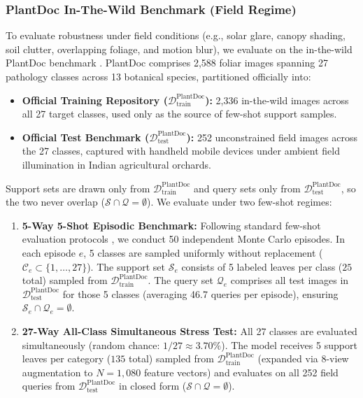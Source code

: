 \documentclass[preprint,12pt]{elsarticle}
\begin{document}
\subsubsection{PlantDoc In-The-Wild Benchmark (Field Regime)}
To evaluate robustness under field conditions (e.g., solar glare, canopy shading, soil clutter, overlapping foliage, and motion blur), we evaluate on the in-the-wild PlantDoc benchmark \cite{singh2020plantdoc}. PlantDoc comprises 2,588 foliar images spanning 27 pathology classes across 13 botanical species, partitioned officially into:
\begin{itemize}
    \item \textbf{Official Training Repository ($\mathcal{D}_{\text{train}}^{\text{PlantDoc}}$):} 2,336 in-the-wild images across all 27 target classes, used only as the source of few-shot support samples.
    \item \textbf{Official Test Benchmark ($\mathcal{D}_{\text{test}}^{\text{PlantDoc}}$):} 252 unconstrained field images across the 27 classes, captured with handheld mobile devices under ambient field illumination in Indian agricultural orchards.
\end{itemize}
Support sets are drawn only from $\mathcal{D}_{\text{train}}^{\text{PlantDoc}}$ and query sets only from $\mathcal{D}_{\text{test}}^{\text{PlantDoc}}$, so the two never overlap ($\mathcal{S} \cap \mathcal{Q} = \emptyset$). We evaluate under two few-shot regimes:
\begin{enumerate}
    \item \textbf{5-Way 5-Shot Episodic Benchmark:} Following standard few-shot evaluation protocols \cite{snell2017prototypical,zhou2026vsf}, we conduct 50 independent Monte Carlo episodes. In each episode $e$, 5 classes are sampled uniformly without replacement ($\mathcal{C}_e \subset \{1, \dots, 27\}$). The support set $\mathcal{S}_e$ consists of 5 labeled leaves per class ($25$ total) sampled from $\mathcal{D}_{\text{train}}^{\text{PlantDoc}}$. The query set $\mathcal{Q}_e$ comprises all test images in $\mathcal{D}_{\text{test}}^{\text{PlantDoc}}$ for those 5 classes (averaging 46.7 queries per episode), ensuring $\mathcal{S}_e \cap \mathcal{Q}_e = \emptyset$.
    \item \textbf{27-Way All-Class Simultaneous Stress Test:} All 27 classes are evaluated simultaneously (random chance: $1/27 \approx 3.70\%$). The model receives 5 support leaves per category ($135$ total) sampled from $\mathcal{D}_{\text{train}}^{\text{PlantDoc}}$ (expanded via 8-view augmentation to $N = 1{,}080$ feature vectors) and evaluates on all 252 field queries from $\mathcal{D}_{\text{test}}^{\text{PlantDoc}}$ in closed form ($\mathcal{S} \cap \mathcal{Q} = \emptyset$).
\end{enumerate}
\end{document}
